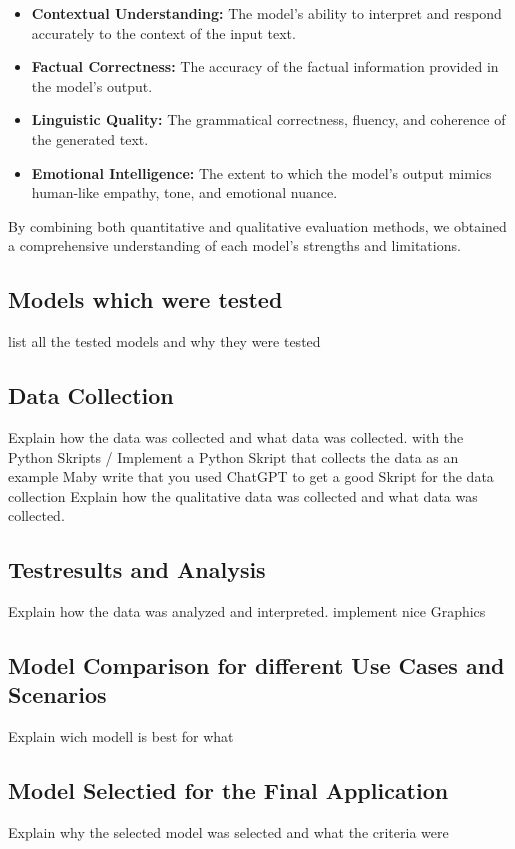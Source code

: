 \begin{itemize}
    \item \textbf{Contextual Understanding:} The model's ability to interpret and respond accurately to the context of the input text.
    \item \textbf{Factual Correctness:} The accuracy of the factual information provided in the model's output.
    \item \textbf{Linguistic Quality:} The grammatical correctness, fluency, and coherence of the generated text.
    \item \textbf{Emotional Intelligence:} The extent to which the model's output mimics human-like empathy, tone, and emotional nuance.
\end{itemize}

By combining both quantitative and qualitative evaluation methods, 
we obtained a comprehensive understanding of each model's strengths and limitations.


\subsection{Models which were tested}

list all the tested models and why they were tested

\subsection{Data Collection}

Explain how the data was collected and what data was collected.
with the Python Skripts / Implement a Python Skript that collects the data as an example 
Maby write that you used ChatGPT to get a good Skript for the data collection
Explain how the qualitative data was collected and what data was collected.

\subsection{Testresults and Analysis}

Explain how the data was analyzed and interpreted.
implement nice Graphics

\subsection{Model Comparison for different Use Cases and Scenarios}

Explain wich modell is best for what

\subsection{Model Selectied for the Final Application}

Explain why the selected model was selected and what the criteria were








